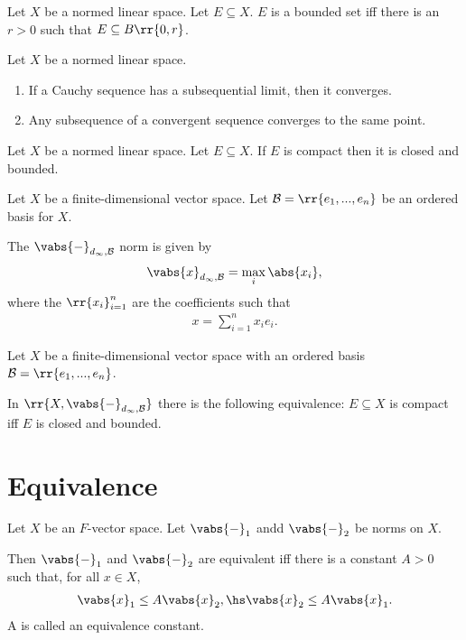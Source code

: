 \documentclass{article}
\begin{document}
\begin{definition}
	\label{def:bounded-set}
	Let $X$ be a normed linear space. Let $E\subseteq X$. $E$ is a bounded set iff there is an
	$r>0$ such that $E\subseteq B\rr{0,r}$.
\end{definition}

\begin{lemma}
	Let $X$ be a normed linear space.
	\begin{enumerate}
		\item If a Cauchy sequence has a subsequential limit, then it converges.
		\item Any subsequence of a convergent sequence converges to the same point.
	\end{enumerate}
\end{lemma}

\begin{theorem}
	Let $X$ be a normed linear space. Let $E\subseteq X$. If $E$ is compact then it is closed and bounded.
\end{theorem}

\begin{definition}
	Let $X$ be a finite-dimensional vector space. Let $\mathcal B=\rr{e_1,...,e_n}$ be
	an ordered basis for $X$.

	The $\vabs{-}_{d_\infty,\mathcal B}$ norm is given by
	\begin{align*}
		\vabs{x}_{d_\infty,\mathcal B}=\max_i \abs{x_i},
	\end{align*}
	where the $\rr{x_i}_{i=1}^n$ are the coefficients such that
	\begin{align*}
		x = \sum_{i=1}^{n} x_i e_i.
	\end{align*}
\end{definition}

\begin{lemma}
	Let $X$ be a finite-dimensional vector space with an ordered basis $\mathcal B = \rr{e_1, ..., e_n}$.

	In $\rr{X,\vabs{-}_{d_\infty,\mathcal B}}$ there is the following equivalence: $E\subseteq X$
	is compact iff $E$ is closed and bounded.
\end{lemma}

\section{Equivalence}
\label{sec:equivalence}

\begin{definition}
	\label{def:equivalence}
	Let $X$ be an $F$-vector space. Let $\vabs{-}_{1}$ andd $\vabs{-}_{2}$ be norms on $X$.

	Then $\vabs{-}_{1}$ and $\vabs{-}_{2}$ are equivalent iff there is a constant $A>0$ such
	that, for all $x\in X$,
	\begin{align*}
		\vabs{x}_{1}\leq A\vabs{x}_{2}, \hs
		\vabs{x}_{2}\leq A\vabs{x}_{1}.
	\end{align*}
	A is called an equivalence constant.
\end{definition}
\end{document}

